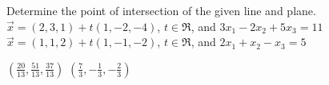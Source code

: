 
\begin{Exercise}[
name={},
title={}, 
difficulty=0,
origin={\cite{SM}}]
Determine the point of intersection of the given line and plane.
\Question $\vec{x}=(2,3,1)+t(1,-2,-4)$, $t\in\Re$, and $3x_1-2x_2+5x_3=11$
\Question $\vec{x}=(1,1,2)+t(1,-1,-2)$, $t\in\Re$, and $2x_1+x_2-x_3=5$
\end{Exercise}

\begin{Answer}
\Question $\left(\frac{20}{13},\frac{51}{13},\frac{37}{13}\right)$
\Question $\left(\frac{7}{3},-\frac{1}{3},-\frac{2}{3}\right)$
\end{Answer}
